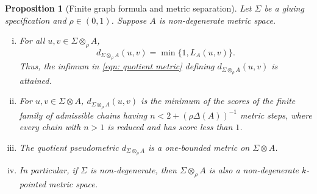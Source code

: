 \documentclass{sn-jnl}%
\theoremstyle{thmstyleone}%
\newtheorem{proposition}[theorem]{Proposition}%
\theoremstyle{thmstyletwo}%
\theoremstyle{thmstylethree}%
\newcommand{\M}{\Sigma}
\newcommand{\F}{\M\otimes}
\newcommand{\Fw}{\M\otimes_{\w}}
\newcommand{\dqm}[1]{d_{\M \otimes_{\w} #1}}
\newcommand{\w}{\rho}
\begin{document}
\begin{proposition}[Finite graph formula and metric separation]
\label{Prop_FiniteBoundaryGraphFormula}
    Let $\Sigma$ be a gluing specification and $\w \in (0,1)$. Suppose $A$ is non-degenerate metric space. 
    \begin{enumerate}[(i)]
        \item For all $u,v\in \Fw A$,
            \begin{equation}
               \dqm{A}(u,v)=\min\{1,L_A(u,v)\}.
            \label{eqn: d = min(1, L_A) and Infimum Attained}
            \end{equation}
            Thus, the infimum in \eqref{eqn: quotient metric} defining $\dqm{A}(u,v)$ is attained.
        \item For $u,v\in \M\otimes A$, $\dqm{A}(u,v)$ is the minimum of the scores of the finite family of admissible  chains having $n<2+({\rho\Delta(A)})^{-1}$ metric steps, where every chain with $n>1$ is reduced and has score less than $1$.
        \item The quotient pseudometric $\dqm{A}$ is a one-bounded metric on $\F A$.   
        \item In particular, if $\Sigma$ is non-degenerate, then $\Fw A$ is also a non-degenerate $k$-pointed metric space.
    \end{enumerate}
\end{proposition}
\end{document}
